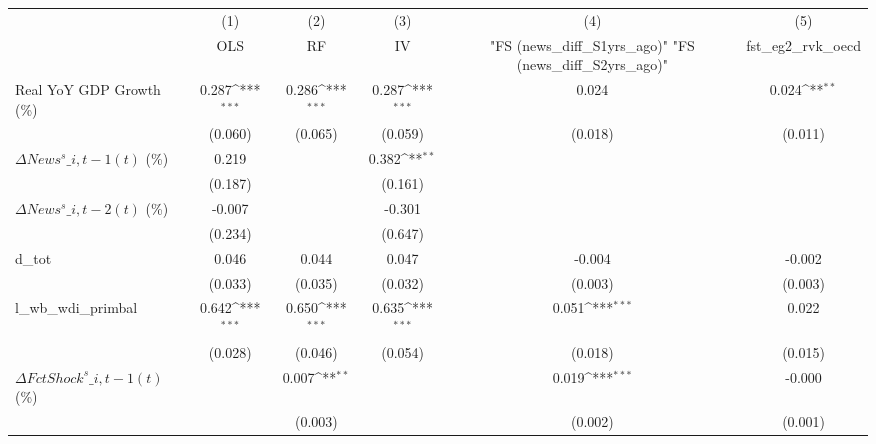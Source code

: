 {
\def\sym#1{\ifmmode^{#1}\else\(^{#1}\)\fi}
\begin{tabular}{l*{5}{c}}
\toprule
                    &\multicolumn{1}{c}{(1)}&\multicolumn{1}{c}{(2)}&\multicolumn{1}{c}{(3)}&\multicolumn{1}{c}{(4)}&\multicolumn{1}{c}{(5)}\\
                    &\multicolumn{1}{c}{OLS}&\multicolumn{1}{c}{RF}&\multicolumn{1}{c}{IV}&\multicolumn{1}{c}{ "FS (news\_diff\_S1yrs\_ago)"  "FS (news\_diff\_S2yrs\_ago)" }&\multicolumn{1}{c}{fst\_eg2\_rvk\_oecd}\\
\midrule
Real YoY GDP Growth (\%)&       0.287\sym{***}&       0.286\sym{***}&       0.287\sym{***}&       0.024         &       0.024\sym{**} \\
                    &     (0.060)         &     (0.065)         &     (0.059)         &     (0.018)         &     (0.011)         \\
\addlinespace
$ \Delta News^s\_{i,t-1}(t)$ (\%)&       0.219         &                     &       0.382\sym{**} &                     &                     \\
                    &     (0.187)         &                     &     (0.161)         &                     &                     \\
\addlinespace
$ \Delta News^s\_{i,t-2}(t)$ (\%)&      -0.007         &                     &      -0.301         &                     &                     \\
                    &     (0.234)         &                     &     (0.647)         &                     &                     \\
\addlinespace
d\_tot               &       0.046         &       0.044         &       0.047         &      -0.004         &      -0.002         \\
                    &     (0.033)         &     (0.035)         &     (0.032)         &     (0.003)         &     (0.003)         \\
\addlinespace
l\_wb\_wdi\_primbal    &       0.642\sym{***}&       0.650\sym{***}&       0.635\sym{***}&       0.051\sym{***}&       0.022         \\
                    &     (0.028)         &     (0.046)         &     (0.054)         &     (0.018)         &     (0.015)         \\
\addlinespace
$ \Delta FctShock^s\_{i,t-1}(t)$ (\%)&                     &       0.007\sym{**} &                     &       0.019\sym{***}&      -0.000         \\
                    &                     &     (0.003)         &                     &     (0.002)         &     (0.001)         \\

\end{tabular}}
